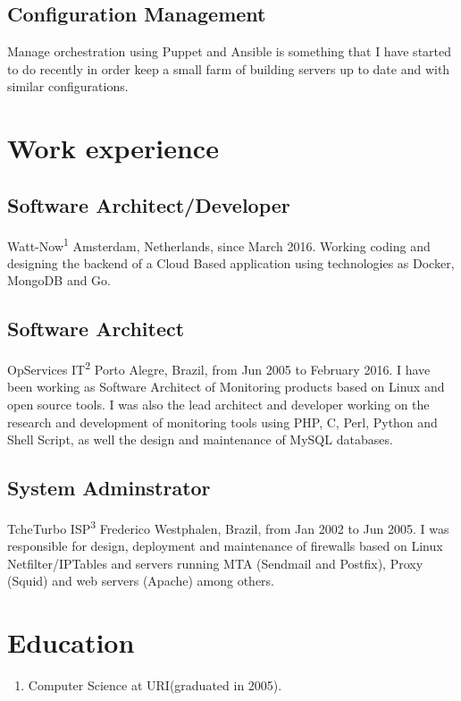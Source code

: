 \documentclass{article}
\begin{document}
\begin{multicols}{2}
\subsection{Configuration Management}
Manage orchestration using Puppet and Ansible is something that
I have started to do recently in order keep a small farm of building servers
up to date and with similar configurations.

\section{Work experience}
\subsection{Software Architect/Developer}
Watt-Now\textsuperscript{1} Amsterdam, Netherlands, since March 2016. Working coding
and designing the backend of a Cloud Based application using technologies as Docker,
MongoDB and Go.

\subsection{Software Architect}
OpServices IT\textsuperscript{2} Porto Alegre, Brazil, from Jun 2005 to February 
2016. I have been working as Software Architect of Monitoring products based on Linux
and open source tools. I was also the lead architect and developer working on the 
research and development of monitoring tools using PHP, C, Perl, Python and Shell 
Script, as well the design and maintenance of MySQL databases.

\subsection{System Adminstrator}
TcheTurbo ISP\textsuperscript{3} Frederico Westphalen, Brazil, from Jan 2002 to Jun 2005.
I was responsible for design, deployment and maintenance of firewalls based on
Linux Netfilter/IPTables and servers running MTA (Sendmail and Postfix), Proxy
(Squid) and web servers (Apache) among others.

\section{Education}
\begin{enumerate}
\item Computer Science at URI(graduated in 2005).
\end{enumerate}


\end{multicols}
\end{document}
